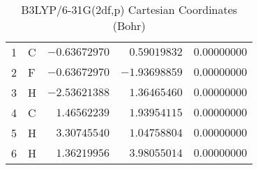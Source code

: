 \documentclass[10pt,oneside]{article}
\begin{document}
\begin{table}[h]
\centering
\caption{B3LYP/6-31G(2df,p) Cartesian Coordinates (Bohr)}
\begin{tabular}{llrrr}
\toprule
1  & C  & $-0.63672970$ & $ 0.59019832$ & $ 0.00000000$ \\
2  & F  & $-0.63672970$ & $-1.93698859$ & $ 0.00000000$ \\
3  & H  & $-2.53621388$ & $ 1.36465460$ & $ 0.00000000$ \\
4  & C  & $ 1.46562239$ & $ 1.93954115$ & $ 0.00000000$ \\
5  & H  & $ 3.30745540$ & $ 1.04758804$ & $ 0.00000000$ \\
6  & H  & $ 1.36219956$ & $ 3.98055014$ & $ 0.00000000$ \\
\bottomrule
\end{tabular}
\end{table}
\end{document}
